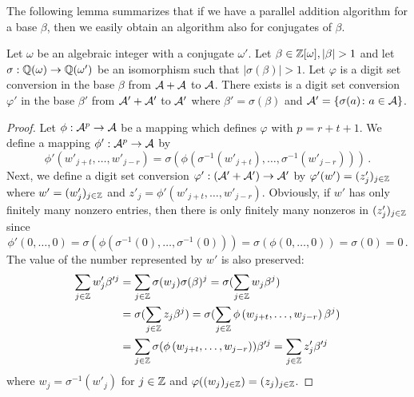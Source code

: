 The following lemma summarizes that if we have a parallel addition algorithm for a base $\beta$, then we easily obtain an algorithm also for conjugates of $\beta$.
\begin{lem}
\label{lem:parAddAlgForConjugate}
Let $\omega$ be an algebraic integer with a conjugate $\omega'$. Let $\beta\in\Zomega, |\beta|>1$ and let $\sigma:\mathbb{Q}(\omega)\rightarrow \mathbb{Q}(\omega')$ be an isomorphism such that $|\sigma(\beta)|>1$. Let $\varphi$ is a digit set conversion  in the base $\beta$ from $\mathcal{A}+\mathcal{A}$ to $\mathcal{A}$. There exists  is a digit set conversion $\varphi'$ in the base $\beta'$ from $\mathcal{A}'+\mathcal{A}'$ to $\mathcal{A}'$ where $\beta'=\sigma(\beta)$ and $\mathcal{A}'=\{\sigma(a) \colon a\in\mathcal{A}\}$.
\end{lem}
\begin{proof}
Let $\phi:\mathcal{A}^p\rightarrow\mathcal{A}$ be a mapping which defines $\varphi$ with $p=r+t+1$. We define a mapping $\phi':\mathcal{A}^p\rightarrow \mathcal{A}$ by 
$$
\phi'(w'_{j+t}, \dots, w'_{j-r})=\sigma\left(\phi\left(\sigma^{-1}(w'_{j+t}), \dots, \sigma^{-1}(w'_{j-r})\right)\right)\,.
$$
Next, we define a digit set conversion  $\varphi':(\mathcal{A}'+\mathcal{A}')\rightarrow\mathcal{A}'$ by $\varphi'(w')=(z'_j)_{j\in\mathbb{Z}}$ where $w'=(w'_j)_{j\in\mathbb{Z}}$ and $z'_j=\phi'(w'_{j+t}, \dots, w'_{j-r})$. Obviously, if $w'$ has only finitely many nonzero entries, then there is only finitely many nonzeros in $(z'_j)_{j\in\mathbb{Z}}$   since
$$
\phi'(0, \dots, 0)=\sigma\left(\phi\left(\sigma^{-1}(0), \dots, \sigma^{-1}(0)\right)\right)=\sigma\left(\phi\left(0, \dots, 0\right)\right)=\sigma\left(0\right)=0\,.
$$
The value of the number represented by $w'$ is also preserved:
\begin{align*}
\sum_{j\in\mathbb{Z}}w'_j \beta'^j&=\sum_{j\in\mathbb{Z}}\sigma(w_j) \sigma(\beta)^j=\sigma(\sum_{j\in\mathbb{Z}}w_j\beta^j)\\
&=\sigma(\sum_{j\in\mathbb{Z}}z_j\beta^j)=\sigma(\sum_{j\in\mathbb{Z}}\phi\left(w_{j+t}, \dots,w_{j-r}\right)\beta^j)\\
&=\sum_{j\in\mathbb{Z}}\sigma(\phi\left(w_{j+t}, \dots,w_{j-r}\right))\beta'^j=\sum_{j\in\mathbb{Z}}z'_j \beta'^j
\end{align*}
where $w_j=\sigma^{-1}(w'_j)$ for $j\in\mathbb{Z}$ and $\varphi((w_j)_{j\in\mathbb{Z}})=(z_j)_{j\in\mathbb{Z}}$.
\end{proof}

